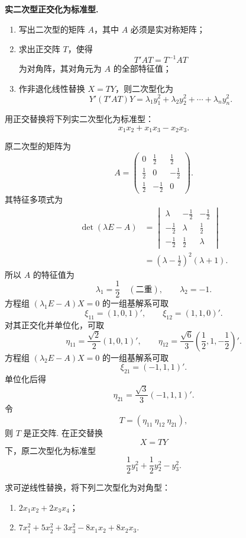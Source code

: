 \begin{algo}
	\textbf{实二次型正交化为标准型.}
	\begin{enumerate}
		\item 写出二次型的矩阵 $A$，其中 $A$ 必须是实对称矩阵；
		\item 求出正交阵 $T$，使得
		\[
		T'AT=T^{-1}AT
		\]
		为对角阵，其对角元为 $A$ 的全部特征值；
		\item 作非退化线性替换 $X=TY$，则二次型化为
		\[
		Y'(T'AT)Y=\lambda_1y_1^2+\lambda_2y_2^2+\cdots+\lambda_ny_n^2.
		\]
	\end{enumerate}
\end{algo}

\begin{problem}

	用正交替换将下列实二次型化为标准型：
	\[
	x_1x_2+x_1x_3-x_2x_3.
	\]
\end{problem}

\begin{solution}
	原二次型的矩阵为
	\[
	A=\begin{pmatrix}
		0&\frac12&\frac12\\
		\frac12&0&-\frac12\\
		\frac12&-\frac12&0
	\end{pmatrix}.
	\]
	其特征多项式为
	\[
	\begin{aligned}
		\det(\lambda E-A)
		&=\begin{vmatrix}
			\lambda&-\frac12&-\frac12\\
			-\frac12&\lambda&\frac12\\
			-\frac12&\frac12&\lambda
		\end{vmatrix} \\
		&=\left(\lambda-\frac12\right)^2(\lambda+1).
	\end{aligned}
	\]
	所以 $A$ 的特征值为
	\[
	\lambda_1=\frac12\quad (\text{二重}),
	\qquad
	\lambda_2=-1.
	\]
	方程组 $(\lambda_1E-A)X=0$ 的一组基解系可取
	\[
	\xi_{11}=(1,0,1)',
	\qquad
	\xi_{12}=(1,1,0)'.
	\]
	对其正交化并单位化，可取
	\[
	\eta_{11}=\frac{\sqrt2}{2}(1,0,1)',
	\qquad
	\eta_{12}=\frac{\sqrt6}{3}\left(\frac12,1,-\frac12\right)'.
	\]
	方程组 $(\lambda_2E-A)X=0$ 的一组基解系可取
	\[
	\xi_{21}=(-1,1,1)'.
	\]
	单位化后得
	\[
	\eta_{21}=\frac{\sqrt3}{3}(-1,1,1)'.
	\]
	令
	\[
	T=(\eta_{11}\ \eta_{12}\ \eta_{21}),
	\]
	则 $T$ 是正交阵. 在正交替换
	\[
	X=TY
	\]
	下，原二次型化为标准型
	\[
	\frac12y_1^2+\frac12y_2^2-y_3^2.
	\]
\end{solution}

\begin{problem}
	求可逆线性替换，将下列二次型化为对角型：
	\begin{enumerate}
		\item $2x_1x_2+2x_3x_4$；
		\item $7x_1^2+5x_2^2+3x_3^2-8x_1x_2+8x_2x_3$.
	\end{enumerate}
\end{problem}

